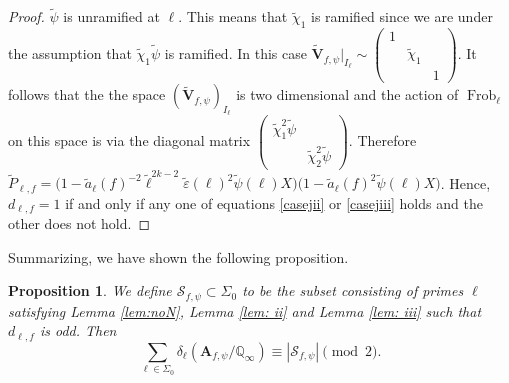 \documentclass{amsart}
\newcommand{\Q}{\mathbb{Q}}
\newcommand{\bV}{\mathbf{V}}
\newcommand{\bA}{\mathbf{A}}
\newcommand{\Frob}{\operatorname{Frob}}
\newtheorem{auxiliary proposition}[theorem]{Auxiliary Proposition}
\newtheorem{main conjecture}[theorem]{Main Conjecture}
\newtheorem{main theorem}[theorem]{Main Theorem}
\newtheorem{modesty proposition}[theorem]{Modesty Proposition}
\newtheorem{open problem}[theorem]{Open Problem}
\newtheorem{proposition}[theorem]{Proposition}
\newtheorem{convergence lemma}[theorem]{Convergence Lemma}
\newtheorem{corrected lemma}[theorem]{Corrected Lemma}
\newtheorem{growth lemma}[theorem]{Growth Lemma}
\newtheorem{coefficient lemma}[theorem]{Integrality Lemma}
\newtheorem{interpolation lemma}[theorem]{Interpolation Lemma}
\newtheorem{kernel lemma}[theorem]{Kernel Lemma}
\newtheorem{limit lemma}[theorem]{Limit Lemma}
\newtheorem{tandem lemma}[theorem]{Modesty Lemma}
\newtheorem{zero-finding lemma}[theorem]{Zero-Finding Lemma}
\begin{document}
\begin{proof}
 $\tilde{\psi}$ is unramified at $\ell$. This means that $\tilde{\chi}_1$ is ramified since we are under the assumption that $\tilde{\chi}_1\tilde{\psi}$ is ramified.
In this case 
$\tilde{\bV}_{f,\psi}|_{I_\ell}\sim \begin{pmatrix}
1 & ~ & ~\\
~ & \tilde{\chi}_1 & ~\\
~ & ~ & 1
\end{pmatrix}.$ 
It follows that the the space $(\tilde{\bV}_{f,\psi})_{I_\ell}$ is two dimensional and the action of $\Frob_\ell$ on this space is via the diagonal matrix $\begin{pmatrix}
\tilde{\chi}_1^2\tilde{\psi} & ~\\
~ & \tilde{\chi}_2^2\tilde{\psi}
\end{pmatrix}.$
Therefore $\tilde{P}_{\ell,f}=\big(1-\tilde{a}_\ell(f)^{-2}\tilde{\ell}^{2k-2}\tilde{\varepsilon}(\ell)^2\tilde{\psi}(\ell)X\big)\big(1-\tilde{a}_\ell(f)^2\tilde{\psi}(\ell)X\big)$. Hence, 
$d_{\ell,f}=1$ if and only if any one of equations \eqref{casejii} or \eqref{casejiii} holds and the other does not hold.
\end{proof}
Summarizing, we have shown the following proposition.
\begin{proposition}\label{prop: mod2}
   We define $\mathcal{S}_{f, \psi}\subset \Sigma_0$  to be the subset consisting of primes $\ell$ satisfying Lemma \ref{lem:noN}, Lemma \ref{lem: ii} and Lemma \ref{lem: iii} such that $d_{\ell,f}$ is odd. Then $$\sum_{\ell \in \Sigma_0} \delta_\ell(\bA_{f,\psi}/\Q_\infty)\equiv |\mathcal{S}_{f, \psi}| \pmod 2.$$
\end{proposition}
\end{document}
